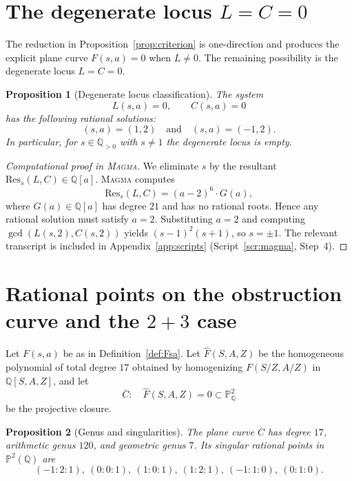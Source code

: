 \documentclass[12pt]{article}
\newtheorem{proposition}{Proposition}
\theoremstyle{remark}
\theoremstyle{definition}
\begin{document}

\section{The degenerate locus \texorpdfstring{$L=C=0$}{L=C=0}}\label{sec:degenerate}

The reduction in Proposition~\ref{prop:criterion} is one-direction and produces the explicit plane curve $F(s,a)=0$ when $L\neq 0$.
The remaining possibility is the degenerate locus $L=C=0$.

\begin{proposition}[Degenerate locus classification]\label{prop:degenerate}
The system
\[
L(s,a)=0,\qquad C(s,a)=0
\]
has the following rational solutions:
\[
(s,a)=(1,2)\quad\text{and}\quad (s,a)=(-1,2).
\]
In particular, for $s\in\mathbb{Q}_{>0}$ with $s\neq 1$ the degenerate locus is empty.
\end{proposition}

\begin{proof}[Computational proof in \textsc{Magma}]
We eliminate $s$ by the resultant $\mathrm{Res}_{s}(L,C)\in\mathbb{Q}[a]$.
\textsc{Magma} computes
\[
\mathrm{Res}_{s}(L,C)=(a-2)^{6}\cdot G(a),
\]
where $G(a)\in\mathbb{Q}[a]$ has degree $21$ and has no rational roots.
Hence any rational solution must satisfy $a=2$.
Substituting $a=2$ and computing $\gcd(L(s,2),C(s,2))$ yields $(s-1)^{2}(s+1)$, so $s=\pm 1$.
The relevant transcript is included in Appendix~\ref{app:scripts} (Script~\ref{scr:magma}, Step~4).
\end{proof}


\section{Rational points on the obstruction curve and the $2+3$ case}\label{sec:points}

Let $F(s,a)$ be as in Definition~\ref{def:Fsa}.
Let $\widehat{F}(S,A,Z)$ be the homogeneous polynomial of total degree $17$ obtained by homogenizing $F(S/Z,A/Z)$ in $\mathbb{Q}[S,A,Z]$, and let
\begin{equation}\label{eq:Cproj}
\overline{C}:\quad \widehat{F}(S,A,Z)=0 \subset \mathbb{P}^{2}_{\mathbb{Q}}
\end{equation}
be the projective closure.

\begin{proposition}[Genus and singularities]\label{prop:genus}
The plane curve $\overline{C}$ has degree $17$, arithmetic genus $120$, and geometric genus $7$.
Its singular rational points in $\mathbb{P}^{2}(\mathbb{Q})$ are
\[
(-1:2:1),\ (0:0:1),\ (1:0:1),\ (1:2:1),\ (-1:1:0),\ (0:1:0).
\]
\end{proposition}
\end{document}

